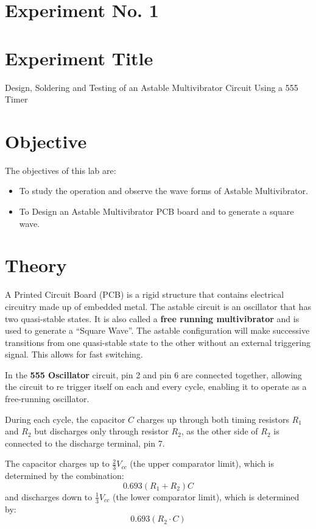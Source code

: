 \documentclass[a4paper,12pt]{article}
\begin{document}
\section*{Experiment No. 1}

\section*{Experiment Title }
Design, Soldering and Testing of an Astable Multivibrator Circuit Using a 555 Timer
	\section{Objective}

The objectives of this lab are:
\begin{itemize}
\item To study the operation and observe the wave forms of Astable Multivibrator.
\item To Design an Astable Multivibrator PCB board and to generate a square wave.

	
\end{itemize}
\section{Theory}

A Printed Circuit Board (PCB) is a rigid structure that contains electrical circuitry made up of embedded metal. The astable circuit is an oscillator that has two quasi-stable states. It is also called a \textbf{free running multivibrator} and is used to generate a ``Square Wave''. The astable configuration will make successive transitions from one quasi-stable state to the other without an external triggering signal. This allows for fast switching.

In the \textbf{555 Oscillator} circuit, pin 2 and pin 6 are connected together, allowing the circuit to re trigger itself on each and every cycle, enabling it to operate as a free-running oscillator.

During each cycle, the capacitor $C$ charges up through both timing resistors $R_1$ and $R_2$ but discharges only through resistor $R_2$, as the other side of $R_2$ is connected to the discharge terminal, pin 7.

The capacitor charges up to $\frac{2}{3}V_{cc}$ (the upper comparator limit), which is determined by the combination:
\[
0.693(R_1 + R_2)C
\]
and discharges down to $\frac{1}{3}V_{cc}$ (the lower comparator limit), which is determined by:
\[
0.693(R_2 \cdot C)
\]
\end{document}
